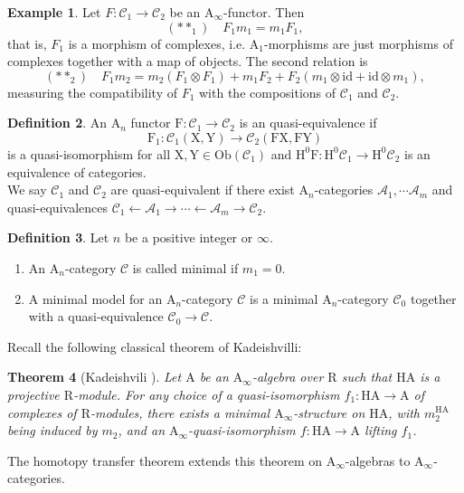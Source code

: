 \documentclass{article}
\theoremstyle{plain}
\newtheorem{theorem}{Theorem}[subsection]   %
\theoremstyle{definition}
\newtheorem{definition}[theorem]{Definition}
\newtheorem{example}[theorem]{Example}
\theoremstyle{remark}
\newcommand{\mr}{\mathrm}
\newcommand{\Aa}{\mr{A}_{\infty}}
\newcommand{\Cc}{\mathcal C}
\newcommand{\3}{\vspace{3mm}}
\newcommand{\2}{\vspace{2mm}}
\newcommand{\1}{\vspace{1mm}}
\begin{document}
\2
\begin{example}
 Let $F : \Cc_1 \to \Cc_2$ be an $\Aa$-functor. Then $$(**_1) \quad F_1m_1=m_1F_1,$$ that is, $F_1$ is a morphism of complexes, i.e. $\mr{A}_1$-morphisms are just morphisms of complexes together with a map of objects. The second relation is $$(**_2) \quad F_1m_2 = m_2(F_1\otimes F_1) + m_1F_2+F_2(m_1\otimes \mr{id} +\mr{id}\otimes m_1),$$ measuring the compatibility of $F_1$ with the compositions of $\Cc_1$ and $\Cc_2$.
\end{example}
\2
\begin{definition}
An $\mr{A}_n$ functor $\mr{F}:\mathcal{C}_1\to \mathcal{C}_2$ is an quasi-equivalence if $$\mr{F}_1:\mathcal{C}_1(\mr{X},\mr{Y})\to \mathcal{C}_2(\mr{F}\mr{X},\mr{F}\mr{Y})$$ is a quasi-isomorphism for all $\mr{X,Y}\in \mr{Ob}(\mathcal{C}_1)$ and $\mr{H}^0\mr{F}:\mr{H}^0\mathcal{C}_1\to \mr{H}^0\mathcal{C}_2$ is an equivalence of categories. \\
We say $\mathcal{C}_1$ and $\mathcal{C}_2$ are quasi-equivalent if there exist $\mr{A}_n$-categories $\mathcal{A}_1,\cdots \mathcal{A}_m$ and quasi-equivalences $\Cc_1 \leftarrow \mathcal{A}_1 \rightarrow \cdots \leftarrow \mathcal{A}_m \rightarrow \Cc_2$.
\end{definition}
\2
\begin{definition}Let $n$ be a positive integer or $\infty$.
\begin{enumerate}
 \item An $\mr{A}_n$-category $\Cc$ is called minimal if $m_1=0$.
 \item A minimal model for an $\mr{A}_n$-category $\Cc$ is a minimal $\mr{A}_n$-category $\Cc_0$ together with a quasi-equivalence $\Cc_0 \to \Cc$.
 \end{enumerate}
\end{definition}
Recall the following classical theorem of Kadeishvilli:
\2
\begin{theorem}[Kadeishvili \cite{MR580645}]
 Let $\mr{A}$ be an $\Aa$-algebra over $\mr{R}$ such that $\mr{HA}$ is a projective $\mr{R}$-module. For any choice of a quasi-isomorphism $f_1 : \mr{HA} \to \mr{A}$ of complexes of $\mr{R}$-modules, there exists a minimal $\Aa$-structure on $\mr{HA}$, with $m^{\mr{HA}}_2$ being induced by $m_2$, and an $\Aa$-quasi-isomorphism $f : \mr{HA} \to \mr{A}$ lifting $f_1$.
\end{theorem}
The homotopy transfer theorem extends this theorem on $\Aa$-algebras to $\Aa$-categories.
\2
\end{document}
